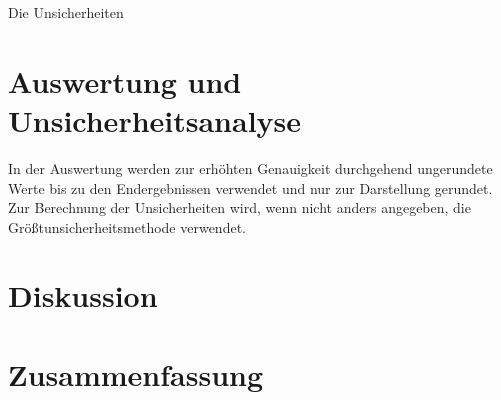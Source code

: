 \documentclass[12pt,a4paper,twoside]{article}
\begin{document}
Die Unsicherheiten



\section{Auswertung und Unsicherheitsanalyse} %

In der Auswertung werden zur erhöhten Genauigkeit durchgehend ungerundete Werte bis zu den Endergebnissen verwendet und nur zur Darstellung gerundet. \\
Zur Berechnung der Unsicherheiten wird, wenn nicht anders angegeben, die Größtunsicherheitsmethode verwendet.


\section{Diskussion} %


\section{Zusammenfassung} %


\printbibliography[heading=bibintoc]
\end{document}
